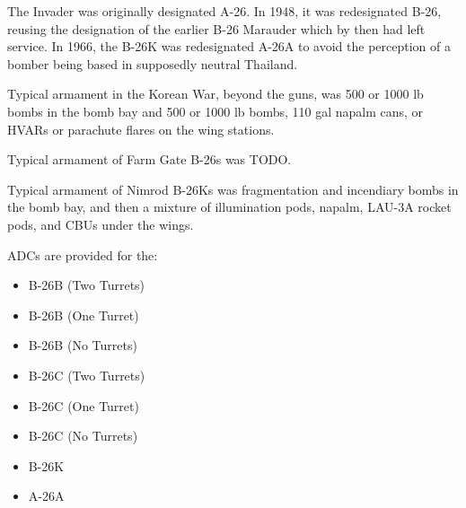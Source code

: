 The Invader was originally designated A-26. In 1948, it was redesignated B-26, reusing the designation of the earlier B-26 Marauder which by then had left service. In 1966, the B-26K was redesignated A-26A to avoid the perception of a bomber being based in supposedly neutral Thailand.

Typical armament in the Korean War, beyond the guns, was 500 or 1000 lb bombs in the bomb bay and 500 or 1000 lb bombs, 110 gal napalm cans, or HVARs or parachute flares on the wing stations.

Typical armament of Farm Gate B-26s was TODO.

Typical armament of Nimrod B-26Ks was fragmentation and incendiary bombs in the bomb bay, and then a mixture of illumination pods, napalm, LAU-3A rocket pods, and CBUs under the wings.

ADCs are provided for the:
\begin{itemize}
\item B-26B (Two Turrets)
\item B-26B (One Turret)
\item B-26B (No Turrets)
\item B-26C (Two Turrets)
\item B-26C (One Turret)
\item B-26C (No Turrets)
\item B-26K
\item A-26A
\end{itemize}
